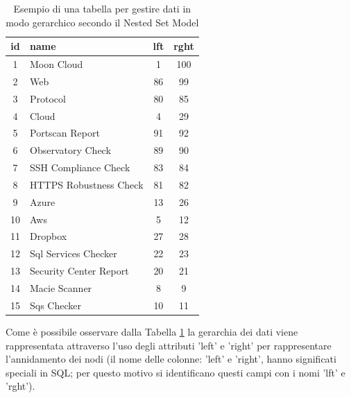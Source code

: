 \begin{table}[ht!]
\centering
\begin{tabular}[c]{| c | l | c | c |} 
	\hline
	id & name & lft & rght \\ [0.5ex] 
	\hline
	\rowcolor{rootnodecell} 1 & Moon Cloud & 1 & 100 \\ [0.5ex] 
	\rowcolor{categorycell} 2 & Web & 86 & 99 \\ [0.5ex] 
	\rowcolor{categorycell} 3 & Protocol & 80 & 85 \\ [0.5ex] 
	\rowcolor{categorycell} 4 & Cloud & 4 & 29 \\ [0.5ex] 
	\rowcolor{evaluationcell} 5 & Portscan Report & 91 & 92 \\ [0.5ex] 
	\rowcolor{evaluationcell} 6 & Observatory Check & 89 & 90 \\ [0.5ex] 
	\rowcolor{evaluationcell} 7 & SSH Compliance Check & 83 & 84 \\ [0.5ex] 
	\rowcolor{evaluationcell} 8 & HTTPS Robustness Check & 81 & 82 \\ [0.5ex] 
	\rowcolor{categorycell} 9 & Azure & 13 & 26 \\ [0.5ex] 
	\rowcolor{categorycell} 10 & Aws & 5 & 12 \\ [0.5ex] 
	\rowcolor{categorycell} 11 & Dropbox & 27 & 28 \\ [0.5ex] 
	\rowcolor{evaluationcell} 12 & Sql Services Checker & 22 & 23 \\ [0.5ex] 
	\rowcolor{evaluationcell} 13 & Security Center Report & 20 & 21 \\ [0.5ex] 
	\rowcolor{evaluationcell} 14 & Macie Scanner & 8 & 9 \\ [0.5ex] 
	\rowcolor{evaluationcell} 15 & Sqs Checker & 10 & 11 \\ [0.5ex]
	\hline
\end{tabular}
\caption{Esempio di una tabella per gestire dati in modo gerarchico secondo il Nested Set Model}
\label{table:nested_set_model_table}
\end{table}

Come è possibile osservare dalla Tabella \ref{table:nested_set_model_table} la gerarchia dei dati viene rappresentata attraverso l'uso 
degli attributi 'left' e 'right' per rappresentare l'annidamento dei nodi (il nome delle colonne: 'left' e 'right', hanno significati 
speciali in SQL; per questo motivo si identificano questi campi con i nomi 'lft' e 'rght'). \\

